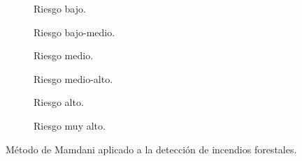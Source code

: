 \begin{figure}[t]
	\centering
	\begin{subfigure}[b]{0.45\textwidth}
		\setlength\figureheight{3cm}
		\setlength\figurewidth{6cm}
		
		\caption{Riesgo bajo.}\label{fig:fire-detection-mamdani-low}
	\end{subfigure}
	\qquad
	\begin{subfigure}[b]{0.45\textwidth}
		\setlength\figureheight{3cm}
		\setlength\figurewidth{6cm}
		
		\caption{Riesgo bajo-medio.}\label{fig:fire-detection-mamdani-low-medium}
	\end{subfigure}
	
	\vspace{1cm}
	\begin{subfigure}[b]{0.45\textwidth}
		\setlength\figureheight{3cm}
		\setlength\figurewidth{6cm}
		
		\caption{Riesgo medio.}\label{fig:fire-detection-mamdani-medium}
	\end{subfigure}
	\qquad
	\begin{subfigure}[b]{0.45\textwidth}
		\setlength\figureheight{3cm}
		\setlength\figurewidth{6cm}
		
		\caption{Riesgo medio-alto.}\label{fig:fire-detection-mamdani-medium-high}
	\end{subfigure}
	
		\vspace{1cm}
		\begin{subfigure}[b]{0.45\textwidth}
			\setlength\figureheight{3cm}
			\setlength\figurewidth{6cm}
			
			\caption{Riesgo alto.}\label{fig:fire-detection-mamdani-high}
		\end{subfigure}
		\qquad
		\begin{subfigure}[b]{0.45\textwidth}
			\setlength\figureheight{3cm}
			\setlength\figurewidth{6cm}
			
			\caption{Riesgo muy alto.}\label{fig:fire-detection-mamdani-very-high}
		\end{subfigure}
	\caption{Método de Mamdani aplicado a la detección de incendios forestales.}
	\label{fig:mamdani-fire-detection-example}
\end{figure}

